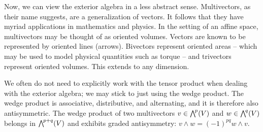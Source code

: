 \documentclass[a4paper,12pt]{article}
\begin{document}
Now, we can view the exterior algebra in a less abstract sense.
Multivectors, as their name suggests, are a generalization of vectors.
It follows that they have myriad applications in mathematics and physics.
In the setting of an affine space, multivectors may be thought of as oriented volumes.
Vectors are known to be represented by oriented lines (arrows).
Bivectors represent oriented areas -- which may be used to model physical quantities such as torque -- and trivectors represent oriented volumes.
This extends to any dimension.

We often do not need to explicitly work with the tensor product when dealing with the exterior algebra; we may stick to just using the wedge product.
The wedge product is associative, distributive, and alternating, and it is therefore also antisymmetric.
The wedge product of two multivectors $v \in \extp^p(V)$ and $w \in \extp^q(V)$ belongs in $\extp^{p+q}(V)$ and exhibits graded antisymmetry: $v \wedge w = (-1)^{pq} w \wedge v$.
\end{document}
